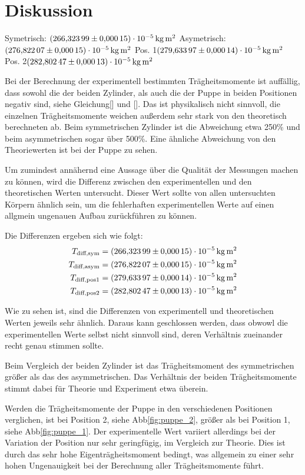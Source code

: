 \section{Diskussion}
\label{sec:Diskussion}


Symetrisch: $\SI{266.32399 (00015)e-5}{\kilo\gram\square\m}$
Asymetrisch: $\SI{276.82207 (00015)e-5}{\kilo\gram\square\m}$
Pos. 1$\SI{279.63397 (00014)e-5}{\kilo\gram\square\m}$
Pos. 2$\SI{282.80247 (00013)e-5}{\kilo\gram\square\m}$

Bei der Berechnung der experimentell bestimmten Trägheitsmomente ist auffällig, dass sowohl die der beiden Zylinder, als auch die 
der Puppe in beiden Positionen negativ sind, siehe Gleichung[] und []. Das ist physikalisch nicht sinnvoll, die einzelnen 
Trägheitsmomente weichen außerdem sehr stark von den theoretisch berechneten ab. Beim symmetrischen Zylinder ist die Abweichung etwa
250\% und beim asymmetrischen sogar über 500\%. Eine ähnliche Abweichung von den Theoriewerten ist bei der Puppe zu sehen.

Um zumindest annähernd eine Aussage über die Qualität der Messungen machen zu können, wird die Differenz zwischen den experimentellen 
und den theoretischen Werten untersucht.
Dieser Wert sollte von allen untersuchten Körpern ähnlich sein, um 
die fehlerhaften experimentellen Werte auf einen allgmein ungenauen Aufbau zurückführen zu können.

Die Differenzen ergeben sich wie folgt:
\begin{align}
T_\text{diff,sym}& = \SI{266.32399 (00015)e-5}{\kilo\gram\square\m} \\
T_\text{diff,asym}& = \SI{276.82207 (00015)e-5}{\kilo\gram\square\m} \\
T_\text{diff,pos1}& = \SI{279.63397 (00014)e-5}{\kilo\gram\square\m} \\
T_\text{diff,pos2}& = \SI{282.80247 (00013)e-5}{\kilo\gram\square\m}
\end{align}

Wie zu sehen ist, sind die Differenzen von experimentell und theoretischen Werten jeweils sehr ähnlich.
Daraus kann geschlossen werden, dass obwowl die experimentellen Werte selbst nicht sinnvoll sind, deren Verhältnis zueinander recht 
genau stimmen sollte. 

Beim Vergleich der beiden Zylinder ist das Trägheitsmoment des symmetrischen größer als das des asymmetrischen. Das Verhältnis der
beiden Trägheitsmomente stimmt dabei für Theorie und Experiment etwa überein. 

Werden die Trägheitsmomente der Puppe in den verschiedenen Positionen verglichen, ist bei Position 2, siehe Abb\ref{fig:puppe_2}, 
größer als bei Position 1, siehe Abb\ref{fig:puppe_1}. Der experimentelle Wert variiert allerdings bei der Variation der Position nur 
sehr geringfügig, im Vergleich zur Theorie. Dies ist durch das sehr hohe Eigenträgheitsmoment bedingt, was allgemein zu einer sehr hohen
Ungenauigkeit bei der Berechnung aller Trägheitsmomente führt. 

